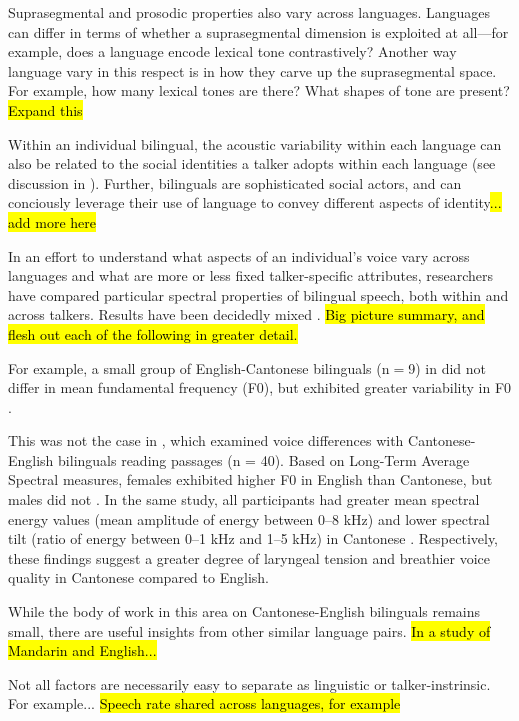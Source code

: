 Suprasegmental and prosodic properties also vary across languages. Languages can differ in terms of whether a suprasegmental dimension is exploited at all---for example, does a language encode lexical tone contrastively? Another way language vary in this respect is in how they carve up the suprasegmental space. For example, how many lexical tones are there? What shapes of tone are present? \hl{Expand this}

Within an individual bilingual, the acoustic variability within each language can also be related to the social identities a talker adopts within each language (see discussion in \citet{cheng_2020_f0}). Further, bilinguals are sophisticated social actors, and can conciously leverage their use of language to convey different aspects of identity\hl{... add more here}

In an effort to understand what aspects of an individual's voice vary across languages and what are more or less fixed talker-specific attributes, researchers have compared particular spectral properties of bilingual speech, both within and across talkers. Results have been decidedly mixed \citep{cheng_2020_f0,altenberg_2006_f0,ryabov_2016_self}. \hl{Big picture summary, and flesh out each of the following in greater detail.}

For example, a small group of English-Cantonese bilinguals (n$=$9) in did not differ in mean fundamental frequency (F0), but exhibited greater variability in F0 \citep{altenberg_2006_f0}. 

This was not the case in \citet{ng_2012_ltas}, which examined voice differences with Cantonese-English bilinguals reading passages (n = 40). Based on Long-Term Average Spectral measures, females exhibited higher F0 in English than Cantonese, but males did not \citep{ng_2012_ltas}. In the same study, all participants had greater mean spectral energy values (mean amplitude of energy between 0--8 kHz) and lower spectral tilt (ratio of energy between 0--1 kHz and 1--5 kHz) in Cantonese \citep{ng_2012_ltas}. Respectively, these findings suggest a greater degree of laryngeal tension and breathier voice quality in Cantonese compared to English.

While the body of work in this area on Cantonese-English bilinguals remains small, there are useful insights from other similar language pairs. \hl{In a study of Mandarin and English...}

Not all factors are necessarily easy to separate as linguistic or talker-instrinsic. For example... \hl{Speech rate shared across languages, for example}

